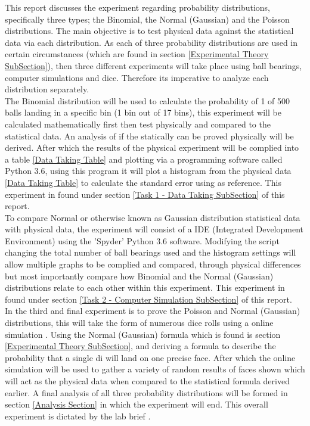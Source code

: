 \documentclass[11pt]{article}
\begin{document}
This report discusses the experiment regarding probability distributions, specifically three types; the Binomial, the Normal (Gaussian) and the Poisson distributions. The main objective is to test physical data against the statistical data via each distribution. As each of three probability distributions are used in certain circumstances (which are found in section \ref{Experimental Theory SubSection}), then three different experiments will take place using ball bearings, computer simulations and dice. Therefore its imperative to analyze each distribution separately. \\

The Binomial distribution will be used to calculate the probability of 1 of 500 balls landing in a specific bin (1 bin out of 17 bins), this experiment will be calculated mathematically first then test physically and compared to the statistical data. An analysis of if the statically can be proved physically will be derived. After which the results of the physical experiment will be complied into a  table \ref{Data Taking Table} and plotting via a programming software called Python 3.6, using this program it will plot a histogram from the physical data \ref{Data Taking Table} to calculate the standard error using \cite{Introduction-to-Error-Analysis} as reference. This experiment in found under section \ref{Task 1 - Data Taking SubSection} of this report. \\

To compare Normal or otherwise known as Gaussian distribution statistical data with physical data, the experiment will consist of a IDE (Integrated Development Environment) using the 'Spyder' Python 3.6 software. Modifying the script changing the total number of ball bearings used and the histogram settings will allow multiple graphs to be complied and compared, through physical differences but most importantly compare how Binomial and the Normal (Gaussian) distributions relate to each other within this experiment. This experiment in found under section \ref{Task 2 - Computer Simulation SubSection} of this report.\\

In the third and final experiment is to prove the Poisson and Normal (Gaussian) distributions, this will take the form of numerous dice rolls using a online simulation \cite{Dice-Roll}. Using the Normal (Gaussian) formula which is found is  section \ref{Experimental Theory SubSection}, and deriving a formula to describe the probability that a single di will land on one precise face. After which the online simulation will be used to gather a variety of random results of faces shown which will act as the physical data when compared to the statistical formula derived earlier. A final analysis of all three probability distributions will be formed in section \ref{Analysis Section} in which the experiment will end. This overall experiment is dictated by the lab brief \cite{LLR.4-2018}. 
\end{document}
